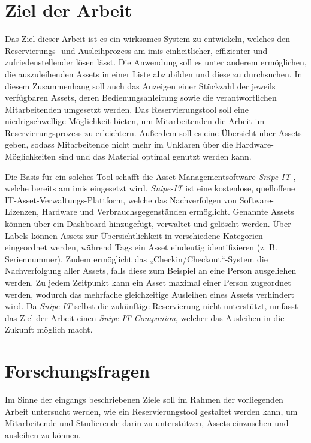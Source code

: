 \section{Ziel der Arbeit}
Das Ziel dieser Arbeit ist es ein wirksames System zu entwickeln, welches den Reservierungs- und
Ausleihprozess am \ac{imis} einheitlicher, effizienter und zufriedenstellender lösen lässt. Die
Anwendung soll es unter anderem ermöglichen, die auszuleihenden Assets in einer Liste abzubilden und
diese zu durchsuchen. In diesem Zusammenhang soll auch das Anzeigen einer Stückzahl der jeweils
verfügbaren Assets, deren Bedienungsanleitung sowie die verantwortlichen Mitarbeitenden umgesetzt
werden. Das Reservierungstool soll eine niedrigschwellige Möglichkeit bieten, um Mitarbeitenden die
Arbeit im Reservierungsprozess zu erleichtern. Außerdem soll es eine Übersicht über Assets
geben, sodass Mitarbeitende nicht mehr im Unklaren über die Hardware-Möglichkeiten sind und das
Material optimal genutzt werden kann.

Die Basis für ein solches Tool schafft die Asset-Managementsoftware \textit{Snipe-IT}
\cite{noauthor_home_nodate}, welche bereits am \ac{imis} eingesetzt wird. \textit{Snipe-IT} ist eine
kostenlose, quelloffene IT-Asset-Verwaltungs-Plattform, welche das Nachverfolgen von
Software-Lizenzen, Hardware und Verbrauchsgegenständen ermöglicht. Genannte Assets können über ein
Dashboard hinzugefügt, verwaltet und gelöscht werden. Über Labels können Assets zur
Übersichtlichkeit in verschiedene Kategorien eingeordnet werden, während Tags ein Asset eindeutig
identifizieren (z. B. Seriennummer). Zudem ermöglicht das „Checkin/Checkout“-System die
Nachverfolgung aller Assets, falls diese zum Beispiel an eine Person ausgeliehen werden. Zu jedem
Zeitpunkt kann ein Asset maximal einer Person zugeordnet werden, wodurch das mehrfache gleichzeitige
Ausleihen eines Assets verhindert wird. Da \textit{Snipe-IT} selbst die zukünftige Reservierung
nicht unterstützt, umfasst das Ziel der Arbeit einen \textit{Snipe-IT Companion}, welcher das
Ausleihen in die Zukunft möglich macht.


\section{Forschungsfragen}
\label{sec:Forschungsfragen}
Im Sinne der eingangs beschriebenen Ziele soll im Rahmen der vorliegenden Arbeit untersucht werden,
wie ein Reservierungstool gestaltet werden kann, um Mitarbeitende und Studierende darin zu
unterstützen, Assets einzusehen und ausleihen zu können.

